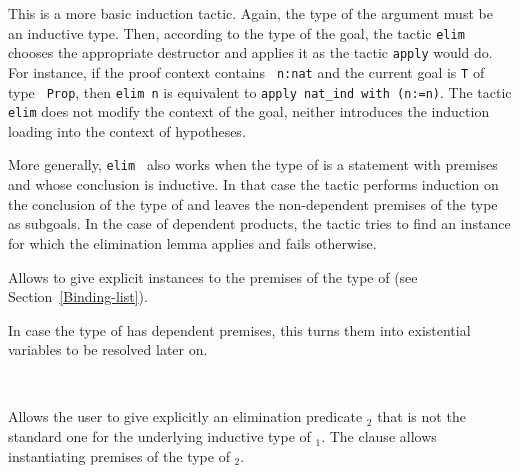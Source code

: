 \begin{Variants}
\item {}\label{elim}

  This is a more basic induction tactic.  Again, the type of the
  argument {\term} must be an inductive type. Then, according to
  the type of the goal, the tactic {\tt elim} chooses the appropriate
  destructor and applies it as the tactic {\tt apply}
  would do. For instance, if the proof context contains {\tt
  n:nat} and the current goal is {\tt T} of type {\tt
  Prop}, then {\tt elim n} is equivalent to {\tt apply nat\_ind with
  (n:=n)}.  The tactic {\tt elim} does not modify the context of
  the goal, neither introduces the induction loading into the context
  of hypotheses.

  More generally, {\tt elim \term} also works when the type of {\term}
  is a statement with premises and whose conclusion is inductive.  In
  that case the tactic performs induction on the conclusion of the
  type of {\term} and leaves the non-dependent premises of the type as
  subgoals.  In the case of dependent products, the tactic tries to
  find an instance for which the elimination lemma applies and fails
  otherwise.

\item {}

  Allows to give explicit instances to the premises of the type
  of {\term} (see Section~\ref{Binding-list}).

\item{}

  In case the type of {\term} has dependent premises, this turns them into
  existential variables to be resolved later on.

\item{}\\
     {}

Allows the user to give explicitly an elimination predicate
{\term$_2$} that is not the standard one for the underlying inductive
type of {\term$_1$}. The {\bindinglist} clause allows
instantiating premises of the type of {\term$_2$}.

\item{}\\
     {}


\end{Variants}
